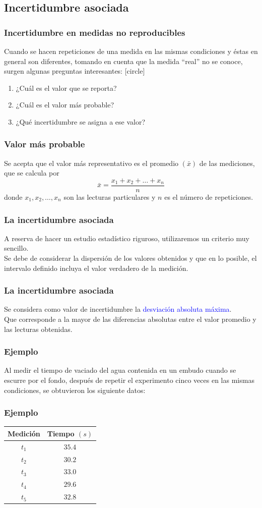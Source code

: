 \subsection{Incertidumbre asociada}
\begin{frame}
\frametitle{Incertidumbre en medidas no reproducibles}
Cuando se hacen repeticiones de una medida en las mismas condiciones y éstas en general son diferentes, tomando en cuenta que la medida \enquote{real} no se conoce, surgen algunas preguntas interesantes:
[circle]
\begin{enumerate}[<+->]
\item ¿Cuál es el valor que se reporta?
\item ¿Cuál es el valor más probable?
\item ¿Qué incertidumbre se asigna a ese valor?
\end{enumerate}
\end{frame}
\begin{frame}
\frametitle{Valor más probable}
Se acepta que el valor más representativo es el promedio $(\bar{x})$ de las mediciones, que se calcula por
\[ \bar{x} = \dfrac{x_{1} + x_{2} + \ldots + x_{n}}{n} \]
donde $x_{1}, x_{2}, \ldots, x_{n}$ son las lecturas particulares y $n$ es el número de repeticiones.
\end{frame}
\begin{frame}
\frametitle{La incertidumbre asociada}
A reserva de hacer un estudio estadístico riguroso, utilizaremos un criterio muy sencillo.
\\
\bigskip
Se debe de considerar la dispersión de los valores obtenidos y que en lo posible, el intervalo definido incluya el valor verdadero de la medición.
\end{frame}
\begin{frame}
\frametitle{La incertidumbre asociada}
Se considera como valor de incertidumbre la \textcolor{blue}{desviación absoluta máxima}.
\\
\bigskip
\pause
Que corresponde a la mayor de las diferencias absolutas entre el valor promedio y las lecturas obtenidas.
\end{frame}
\begin{frame}
\frametitle{Ejemplo}
Al medir el tiempo de vaciado del agua contenida en un embudo cuando se escurre por el fondo, después de repetir el experimento cinco veces en las mismas condiciones, se obtuvieron los siguiente datos:
\end{frame}
\begin{frame}
\frametitle{Ejemplo}
\begin{center}
\begin{tabular}{c | c}
Medición & Tiempo $(s)$ \\ \hline
$t_{1}$ & $35.4$ \\ \hline
$t_{2}$ & $30.2$ \\ \hline
$t_{3}$ & $33.0$ \\ \hline
$t_{4}$ & $29.6$ \\ \hline
$t_{5}$ & $32.8$ \\ \hline
\end{tabular}
\end{center}
\end{frame}
